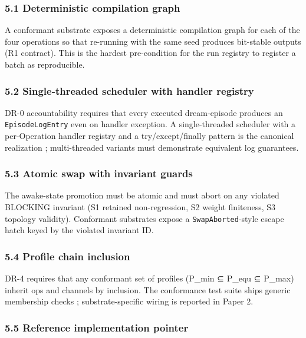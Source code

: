 \documentclass[
]{article}
\begin{document}
\subsubsection{5.1 Deterministic compilation
graph}\label{deterministic-compilation-graph}

A conformant substrate exposes a deterministic compilation graph for
each of the four operations so that re-running with the same seed
produces bit-stable outputs (R1 contract). This is the hardest
pre-condition for the run registry to register a batch as reproducible.

\subsubsection{5.2 Single-threaded scheduler with handler
registry}\label{single-threaded-scheduler-with-handler-registry}

DR-0 accountability requires that every executed dream-episode produces
an \texttt{EpisodeLogEntry} even on handler exception. A single-threaded
scheduler with a per-Operation handler registry and a try/except/finally
pattern is the canonical realization ; multi-threaded variants must
demonstrate equivalent log guarantees.

\subsubsection{5.3 Atomic swap with invariant
guards}\label{atomic-swap-with-invariant-guards}

The awake-state promotion must be atomic and must abort on any violated
BLOCKING invariant (S1 retained non-regression, S2 weight finiteness, S3
topology validity). Conformant substrates expose a
\texttt{SwapAborted}-style escape hatch keyed by the violated invariant
ID.

\subsubsection{5.4 Profile chain
inclusion}\label{profile-chain-inclusion}

DR-4 requires that any conformant set of profiles (P\_min ⊆ P\_equ ⊆
P\_max) inherit ops and channels by inclusion. The conformance test
suite ships generic membership checks ; substrate-specific wiring is
reported in Paper 2.

\subsubsection{5.5 Reference implementation
pointer}\label{reference-implementation-pointer}
\end{document}
